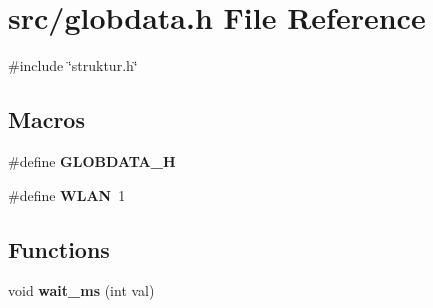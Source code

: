 \section{src/globdata.h File Reference}
\label{globdata_8h}
{\ttfamily \#include \char`\"{}struktur.\+h\char`\"{}}\newline
\subsection*{Macros}
\begin{DoxyCompactItemize}
\item 
\#define \textbf{ G\+L\+O\+B\+D\+A\+T\+A\+\_\+H}
\item 
\#define \textbf{ W\+L\+AN}~1
\end{DoxyCompactItemize}
\subsection*{Functions}
\begin{DoxyCompactItemize}
\item 
void \textbf{ wait\+\_\+ms} (int val)
\end{DoxyCompactItemize}
